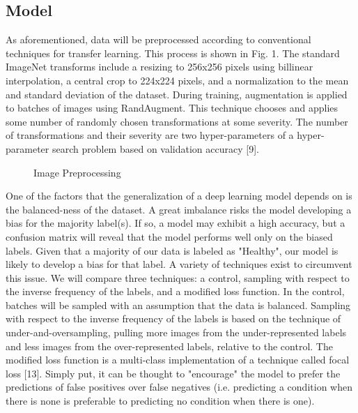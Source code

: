 \documentclass[10pt,twocolumn,letterpaper]{article}
\begin{document}
\subsection{Model}
As aforementioned, data will be preprocessed according to conventional techniques for transfer learning. This process is shown in Fig. 1. The standard ImageNet transforms include a resizing to 256x256 pixels using billinear interpolation, a central crop to 224x224 pixels, and a normalization to the mean and standard deviation of the dataset. During training, augmentation is applied to batches of images using RandAugment. This technique chooses and applies some number of randomly chosen transformations at some severity. The number of transformations and their severity are two hyper-parameters of a hyper-parameter search problem based on validation accuracy [9].
\begin{figure}[htp]
  \hspace*{\fill}%
  \hfill%
  \hfill%
  \hspace*{\fill}%
\caption{Image Preprocessing}
\end{figure}

One of the factors that the generalization of a deep learning model depends on is the balanced-ness of the dataset. A great imbalance risks the model developing a bias for the majority label(s). If so, a model may exhibit a high accuracy, but a confusion matrix will reveal that the model performs well only on the biased labels. Given that a majority of our data is labeled as "Healthy", our model is likely to develop a bias for that label. A variety of techniques exist to circumvent this issue. We will compare three techniques: a control, sampling with respect to the inverse frequency of the labels, and a modified loss function. In the control, batches will be sampled with an assumption that the data is balanced. Sampling with respect to the inverse frequency of the labels is based on the technique of under-and-oversampling, pulling more images from the under-represented labels and less images from the over-represented labels, relative to the control. The modified loss function is a multi-class implementation of a technique called focal loss [13]. Simply put, it can be thought to "encourage" the model to prefer the predictions of false positives over false negatives (i.e. predicting a condition when there is none is preferable to predicting no condition when there is one).
\end{document}
